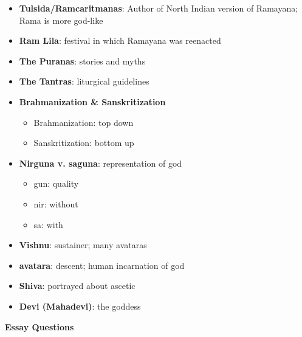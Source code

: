 \documentclass[11pt]{article} %
\begin{document}
\begin{itemize}
\item
{\bf Tulsida/Ramcaritmanas}: Author of North Indian version of Ramayana; Rama is more god-like

\item
{\bf Ram Lila}: festival in which Ramayana was reenacted

\item
{\bf The Puranas}: stories and myths

\item
{\bf The Tantras}: liturgical guidelines

\item
{\bf Brahmanization \& Sanskritization}
\begin{itemize}
\item Brahmanization: top down
\item Sanskritization: bottom up
\end{itemize}

\item
{\bf Nirguna v. saguna}: representation of god
\begin{itemize}
\item gun: quality
\item nir: without
\item sa: with
\end{itemize}

\item
{\bf Vishnu}: sustainer; many avataras

\item
{\bf avatara}: descent; human incarnation of god

\item
{\bf Shiva}: portrayed about ascetic

\item
{\bf Devi (Mahadevi)}: the goddess

\end{itemize}

\begin{center}
{\bf Essay Questions}
\end{center}
\end{document}
